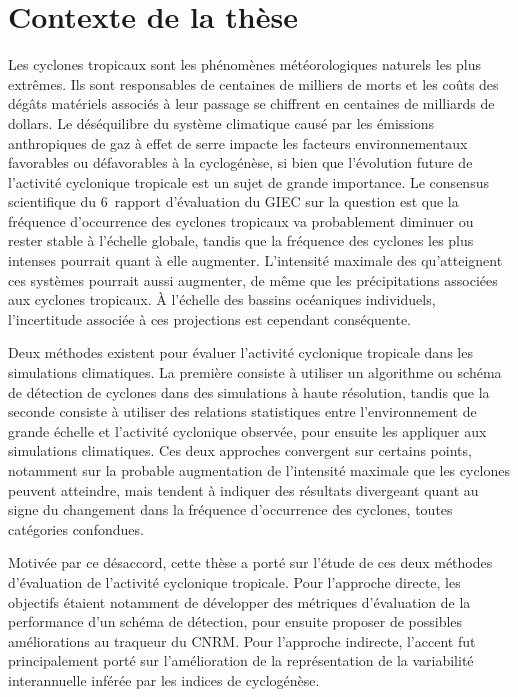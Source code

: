 \documentclass[../main.tex]{subfiles}
\begin{document}
\section*{Contexte de la thèse}

Les cyclones tropicaux sont les phénomènes météorologiques naturels les plus extrêmes. Ils sont responsables de centaines de milliers de morts et les coûts des
dégâts matériels associés à leur passage se chiffrent en centaines de milliards de dollars. Le déséquilibre du système climatique causé par les émissions
anthropiques de gaz à effet de serre impacte les facteurs environnementaux favorables ou défavorables à la cyclogénèse, si bien que l'évolution future de
l'activité cyclonique tropicale est un sujet de grande importance. Le consensus scientifique du 6\ieme\ rapport d'évaluation du GIEC sur la question est que la
fréquence d'occurrence des cyclones tropicaux va probablement diminuer ou rester stable à l'échelle globale, tandis que la fréquence des cyclones les plus
intenses pourrait quant à elle augmenter. L'intensité maximale des qu'atteignent ces systèmes pourrait aussi augmenter, de même que les précipitations associées
aux cyclones tropicaux. À l'échelle des bassins océaniques individuels, l'incertitude associée à ces projections est cependant conséquente.

Deux méthodes existent pour évaluer l'activité cyclonique tropicale dans les simulations climatiques. La première consiste à utiliser un algorithme ou schéma de
détection de cyclones dans des simulations à haute résolution, tandis que la seconde consiste à utiliser des relations statistiques entre l'environnement de
grande échelle et l'activité cyclonique observée, pour ensuite les appliquer aux simulations climatiques. Ces deux approches convergent sur certains points,
notamment sur la probable augmentation de l'intensité maximale que les cyclones peuvent atteindre, mais tendent à indiquer des résultats divergeant quant au
signe du changement dans la fréquence d'occurrence des cyclones, toutes catégories confondues.

Motivée par ce désaccord, cette thèse a porté sur l'étude de ces deux méthodes d'évaluation de l'activité cyclonique tropicale. Pour l'approche directe, les
objectifs étaient notamment de développer des métriques d'évaluation de la performance d'un schéma de détection, pour ensuite proposer de possibles
améliorations au traqueur du CNRM. Pour l'approche indirecte, l'accent fut principalement porté sur l'amélioration de la représentation de la variabilité
interannuelle inférée par les indices de cyclogénèse.
\end{document}
